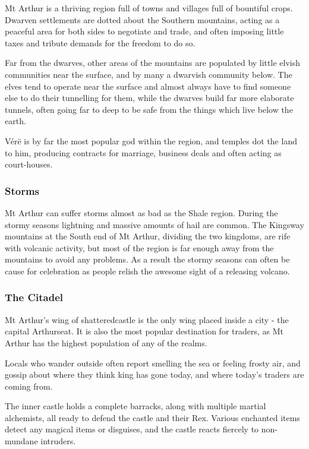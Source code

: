 \begin{multicols}{2}

Mt Arthur is a thriving region full of towns and villages full of bountiful crops.
Dwarven settlements are dotted about the Southern mountains, acting as a peaceful area for both sides to negotiate and trade, and often imposing little taxes and tribute demands for the freedom to do so.

Far from the dwarves, other areas of the mountains are populated by little elvish communities near the surface, and by many a dwarvish community below.
The elves tend to operate near the surface and almost always have to find someone else to do their tunnelling for them, while the dwarves build far more elaborate tunnels, often going far to deep to be safe from the things which live below the earth.

V\'{e}r\"{e} is by far the most popular god within the region, and temples dot the land to him, producing contracts for marriage, business deals and often acting as court-houses.

\subsubsection{Storms}

Mt Arthur can suffer storms almost as bad as the Shale region.
During the stormy seasons lightning and massive amounts of hail are common.
The Kingsway mountains at the South end of Mt Arthur, dividing the two kingdoms, are rife with volcanic activity, but most of the region is far enough away from the mountains to avoid any problems.
As a result the stormy seasons can often be cause for celebration as people relish the awesome sight of a releasing volcano.

\subsubsection{The Citadel}

Mt Arthur's wing of \gls{shatteredcastle} is the only wing placed inside a city - the capital Arthurseat.
It is also the most popular destination for traders, as Mt Arthur has the highest population of any of the realms.

Locals who wander outside often report smelling the sea or feeling frosty air, and gossip about where they think \gls{king} has gone today, and where today's traders are coming from.

The inner castle holds a complete barracks, along with multiple martial alchemists, all ready to defend the castle and their Rex.
Various enchanted items detect any magical items or disguises, and the castle reacts fiercely to non-mundane intruders.


\end{multicols}
